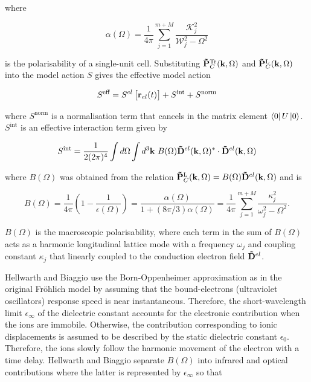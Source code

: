 where

\begin{equation}
    \alpha(\Omega) = \frac{1}{4\pi} \sum_{j=1}^{m+M} \frac{\mathcal{K}_j^2}{\mathcal{W}_j^2 - \Omega^2}
\end{equation}

is the polarisability of a single-unit cell. Substituting $\vb{\Tilde{P}}^{\text{Tr}}_{C}(\vb{k}, \Omega)$ and $\vb{\Tilde{P}}^{\text{L}}_{C}(\vb{k}, \Omega)$ into the model action $S$ gives the effective model action 

\begin{equation}
    S^{\text{eff}} = S^{el}\left[ \vb{r}_{el}(t) \right] + S^{\text{int}} + S^{\text{norm}}
\end{equation}

where $S^{\text{norm}}$ is a normalisation term that cancels in the matrix element $\bra{0} U \ket{0}$. $S^{\text{int}}$ is an effective interaction term given by

\begin{equation}
    S^{\text{int}} = \frac{1}{2 (2\pi)^4} \int d\Omega \int d^3 \vb{k}\ B(\Omega) \vb{\Tilde{D}}^{el}(\vb{k}, \Omega)^* \cdot \vb{\Tilde{D}}^{el}(\vb{k}, \Omega)
\end{equation}

where $B(\Omega)$ was obtained from the relation $\vb{\Tilde{P}}^{\text{L}}_{C}(\vb{k}, \Omega) = B(\Omega) \vb{\Tilde{D}}^{el}(\vb{k}, \Omega)$ and is

\begin{equation}
    B(\Omega) = \frac{1}{4\pi} \left( 1 - \frac{1}{\epsilon(\Omega)} \right) = \frac{\alpha(\Omega)}{1+(8\pi/3)\alpha(\Omega)} = \frac{1}{4\pi} \sum_{j = 1}^{m + M} \frac{\kappa_j^2}{\omega_j^2 - \Omega^2}.
\end{equation}

$B(\Omega)$ is the macroscopic polarisability, where each term in the sum of $B(\Omega)$ acts as a harmonic longitudinal lattice mode with a frequency $\omega_j$ and coupling constant $\kappa_j$ that linearly coupled to the conduction electron field $\vb{\Tilde{D}}^{el}$. 

Hellwarth and Biaggio use the Born-Oppenheimer approximation as in the original Fr\"ohlich model by assuming that the bound-electrons (ultraviolet oscillators) response speed is near instantaneous. Therefore, the short-wavelength limit $\epsilon_\infty$ of the dielectric constant accounts for the electronic contribution when the ions are immobile. Otherwise, the contribution corresponding to ionic displacements is assumed to be described by the static dielectric constant $\epsilon_0$. Therefore, the ions slowly follow the harmonic movement of the electron with a time delay. Hellwarth and Biaggio separate $B(\Omega)$ into infrared and optical contributions where the latter is represented by $\epsilon_\infty$ so that

